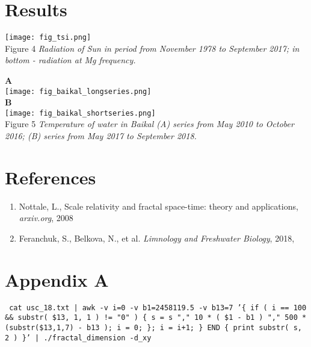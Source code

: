 \documentclass[a4paper]{article}
\begin{document}
\section*{Results}

\texttt{[image: fig\_tsi.png]}\\
\vskip 24pt
Figure 4 \textit{Radiation of Sun in period from November 1978 to September 2017; in bottom - radiation at Mg frequency. }

\newpage
{\large{\textbf{A}}}\\
\texttt{[image: fig\_baikal\_longseries.png]}\\
\vskip 24pt
{\large{\textbf{B}}}\\
\texttt{[image: fig\_baikal\_shortseries.png]}\\
Figure 5 \textit{Temperature of water in Baikal (A) series from May 2010 to October 2016; (B) series from May 2017 to September 2018. }

\section*{References}

\begin{enumerate}

\item Nottale, L., Scale relativity and fractal space-time: theory and applications, \textit{arxiv.org}, 2008

\item Feranchuk, S., Belkova, N., et al. \textit{Limnology and Freshwater Biology}, 2018,

\end{enumerate}

\section*{Appendix A}


\texttt{\small{ cat usc\_18.txt | awk -v i=0 -v b1=2458119.5 -v b13=7 '\{ if ( i == 100 \&\& substr( \$13, 1, 1 ) != "0" ) \{ s = s "," 10 * ( \$1 - b1 ) "," 500 * (substr(\$13,1,7) - b13 ); i = 0; \}; i = i+1; \} END \{ print substr( s, 2 ) \}' | ./fractal\_dimension -d\_xy }}

\end{document}
